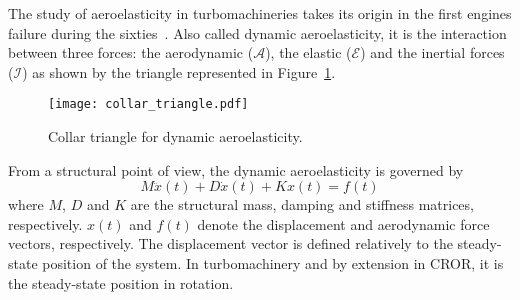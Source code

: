 
The study of aeroelasticity in turbomachineries takes its origin
in the first engines failure during the sixties~\cite{Dugundji2003}.
Also called dynamic aeroelasticity,
it is the interaction between three forces:
the aerodynamic ($\mathcal{A}$), the elastic ($\mathcal{E}$) and
the inertial forces ($\mathcal{I}$) as 
shown by the \citet{Collar1946} triangle represented in 
Figure~\ref{fig:ael_collar_triangle}. 
\begin{figure}[htp]
  \centering
  \texttt{[image: collar\_triangle.pdf]}
  \caption{Collar triangle for dynamic aeroelasticity.}
  \label{fig:ael_collar_triangle}
\end{figure}

From a structural point of view, 
the dynamic aeroelasticity is governed by
\begin{equation}
	M \ddot{x}(t) + D \dot{x}(t) + K x(t) = f(t)
	\label{eq:ael_motion_eq}
\end{equation}
where $M$, $D$ and $K$ are the structural mass, damping 
and stiffness matrices, respectively.
$x(t)$ and $f(t)$ denote the displacement 
and aerodynamic force vectors, respectively. The displacement
vector is defined relatively to the 
steady-state position of the system. In turbomachinery
and by extension in CROR, it is the steady-state position
in rotation.

